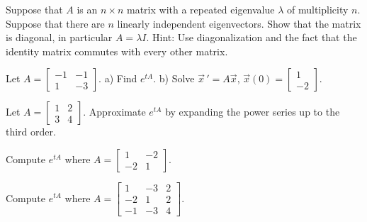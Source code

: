 \documentclass[12pt]{book}
\begin{document}
\begin{exercise}
Suppose that $A$ is an $n \times n$ matrix with a repeated eigenvalue
$\lambda$ of multiplicity $n$.
Suppose that there are $n$ linearly independent eigenvectors.  Show that
the matrix is diagonal, in particular $A = \lambda I$.  Hint: Use
diagonalization and the fact that the identity matrix commutes with every
other matrix.
\end{exercise}

\begin{exercise}
Let $A = \left[ \begin{smallmatrix}
-1 & -1 \\
1 & -3
\end{smallmatrix} \right]$.
a) Find $e^{tA}$.
b) Solve
${\vec{x}\,}' = A \vec{x}$, $\vec{x}(0) =
\left[ \begin{smallmatrix}
1 \\
-2
\end{smallmatrix} \right]$.
\end{exercise}

\begin{exercise}
Let $A = \left[ \begin{smallmatrix}
1 & 2 \\
3 & 4 
\end{smallmatrix} \right]$.
Approximate $e^{tA}$ by expanding the power series
up to the third order.
\end{exercise}

\setcounter{exercise}{100}

\begin{exercise}
Compute
$e^{tA}$ where
$A=\left[ \begin{smallmatrix}
1 & -2 \\
-2 & 1 
\end{smallmatrix}\right]$.
\end{exercise}

\begin{exercise}
Compute
$e^{tA}$ where
$A=\left[ \begin{smallmatrix}
1 & -3 & 2 \\
-2 & 1 & 2 \\
-1 & -3 & 4
\end{smallmatrix}\right]$.
\end{exercise}
\end{document}
